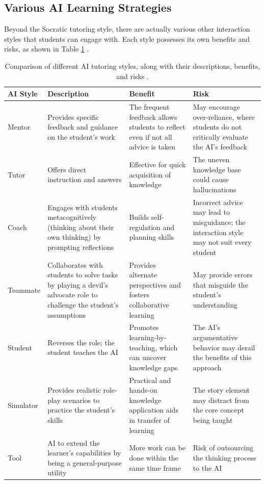 \documentclass{article}
\begin{document}
\subsection{Various AI Learning Strategies}
Beyond the Socratic tutoring style, there are actually various other interaction styles 
that students can engage with. Each style possesses its own benefits and risks, as shown in Table \ref{tab:ai-styles} \cite{Mollick2023}.
\begin{table}[h]
    \centering
    \renewcommand{\arraystretch}{1.2}
    \begin{tabular}{|p{1.5cm}|p{4cm}|p{4cm}|p{4cm}|}
        \hline
        \textbf{AI Style} & \textbf{Description} & \textbf{Benefit} & \textbf{Risk} \\
        \hline
        Mentor &
        Provides specific feedback and guidance on the student’s work &
        The frequent feedback allows students to reflect even if not all advice is taken &
        May encourage over-reliance, where students do not critically evaluate the AI’s feedback \\
        \hline
        Tutor &
        Offers direct instruction and answers &
        Effective for quick acquisition of knowledge &
        The uneven knowledge base could cause hallucinations \\
        \hline
        Coach &
        Engages with students metacognitively (thinking about their own thinking) by prompting reflections &
        Builds self-regulation and planning skills &
        Incorrect advice may lead to misguidance; the interaction style may not suit every student \\
        \hline
        Teammate &
        Collaborates with students to solve tasks by playing a devil’s advocate role to challenge the student’s assumptions &
        Provides alternate perspectives and fosters collaborative learning &
        May provide errors that misguide the student’s understanding \\
        \hline
        Student &
        Reverses the role; the student teaches the AI &
        Promotes learning-by-teaching, which can uncover knowledge gaps &
        The AI’s argumentative behavior may derail the benefits of this approach \\
        \hline
        Simulator &
        Provides realistic role-play scenarios to practice the student's skills &
        Practical and hands-on knowledge application aids in transfer of learning &
        The story element may distract from the core concept being taught \\
        \hline
        Tool &
        AI to extend the learner’s capabilities by being a general-purpose utility &
        More work can be done within the same time frame &
        Risk of outsourcing the thinking process to the AI \\
        \hline
    \end{tabular}
    \caption{Comparison of different AI tutoring styles, along with their descriptions, benefits, and risks \cite{Mollick2023}.}
    \label{tab:ai-styles}
\end{table}
\end{document}
